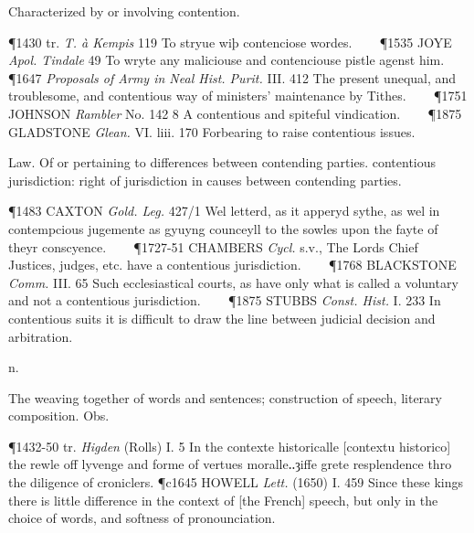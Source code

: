 \begin{description}[wide, labelwidth=!, labelindent=0pt]
\begin{myenumerate}
 Characterized by or involving contention.

\P 1430 tr.  \textit{T. à Kempis} 119 To stryue wiþ contenciose wordes.    
\P 1535 JOYE  \textit{Apol. Tindale} 49 To wryte any maliciouse and contenciouse pistle agenst him.    
\P 1647 \textit{Proposals  of Army in Neal Hist. Purit.} III. 412 The present unequal, and troublesome, and contentious way of ministers' maintenance by Tithes.    
\P 1751 JOHNSON  \textit{Rambler} No. 142 8 A contentious and spiteful vindication.    
\P 1875 GLADSTONE  \textit{Glean.} VI. liii. 170 Forbearing to raise contentious issues.

 Law. Of or pertaining to differences between contending parties. contentious jurisdiction: right of jurisdiction in causes between contending parties.

\P 1483 CAXTON  \textit{Gold. Leg.} 427/1 Wel letterd, as it apperyd sythe, as wel in contempcious jugemente as gyuyng counceyll to the sowles upon the fayte of theyr conscyence.    
\P 1727-51 CHAMBERS  \textit{Cycl.} s.v., The Lords Chief Justices, judges, etc. have a contentious jurisdiction.    
\P 1768 BLACKSTONE  \textit{Comm.} III. 65 Such ecclesiastical courts, as have only what is called a voluntary and not a contentious jurisdiction.    
\P 1875 STUBBS  \textit{Const. Hist.} I. 233 In contentious suits it is difficult to draw the line between judicial decision and arbitration.
\end{myenumerate}


 n.

\noindent {}

\vspace{-0.3cm}

\begin{myenumerate}

 The weaving together of words and sentences; construction of speech, literary composition. Obs.

\P 1432-50 tr.  \textit{Higden} (Rolls) I. 5 In the contexte historicalle [contextu historico] the rewle off lyvenge and forme of vertues moralle‥ȝiffe grete resplendence thro the diligence of croniclers.
\P c1645 HOWELL  \textit{Lett.} (1650) I. 459 Since these kings there is little difference in the context of [the French] speech, but only in the choice of words, and softness of pronounciation.


\end{myenumerate}
\end{description}
